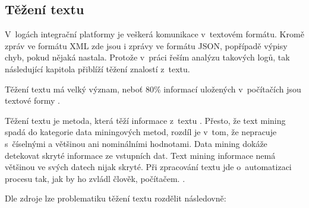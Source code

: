 \documentclass[thesis=M,czech]{FITthesis}[2012/10/20]
\begin{document}
	\subsection{Těžení textu}
		V~logách integrační platformy je veškerá komunikace v~textovém formátu. Kromě zpráv ve formátu XML zde jsou i zprávy ve formátu JSON, popřípadě výpisy chyb, pokud nějaká nastala. Protože v~práci řeším analýzu takových logů, tak následující kapitola přiblíží těžení znalostí z~textu. 
		
		Těžení textu má velký význam, neboť 80\% informací uložených v~počítačích jsou textové formy \cite{IRWebTechniques}.
		
		Těžení textu je metoda, která těží informace z~textu \cite{WittenTextMining}. Přesto, že text mining spadá do kategorie data miningových metod, rozdíl je v~tom, že nepracuje s~číselnými a většinou ani nominálními hodnotami. Data mining dokáže detekovat skryté informace ze vstupních dat. Text mining informace nemá většinou ve svých datech nijak skryté. Při zpracování textu jde o~automatizaci procesu tak, jak by ho zvládl člověk, počítačem. \cite{WittenTextMining}.
		
		Dle zdroje \cite{textAlg} lze problematiku těžení textu rozdělit následovně:
		
\end{document}
